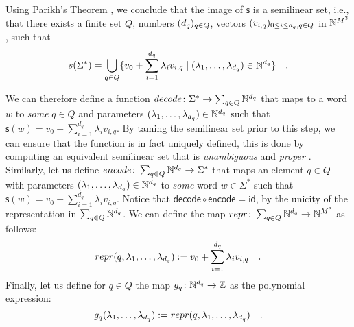 \begin{proofof}
    Using Parikh's Theorem \cite{PARI66},
    we conclude that the image of $\mathsf{s}$ is a semilinear set,
    i.e., that there exists a finite set $Q$,
    numbers $(d_q)_{q \in Q}$,
    vectors $(v_{i,q})_{0 \leq i \leq d_q, q \in Q}$ in $\mathbb{N}^{M^3}$,
    such that
    \begin{equation*}
        \mathsf{s}(\Sigma^*) =
        \bigcup_{q \in Q}
        \setof{
            v_0 + \sum_{i = 1}^{d_q} \lambda_i v_{i,q}
        }{
            (\lambda_1, \dots, \lambda_{d_q}) \in \Nat^{d_q}
        } \quad .
    \end{equation*}

    We can therefore define a function $\mathsf{decode} \colon \Sigma^* \to
    \sum_{q \in Q} \Nat^{d_q}$ that maps to a word $w$ to \emph{some} $q \in Q$
    and parameters $(\lambda_1, \dots, \lambda_{d_q}) \in \mathbb{N}^{d_q}$ such that
    $\mathsf{s}(w) = v_0 + \sum_{i = 1}^{d_q} \lambda_i v_{i,q}$. By taming the
    semilinear set prior to this step, we can ensure that the function is in
    fact uniquely defined, this is done by computing an equivalent semilinear
    set that is \emph{unambiguous} and \emph{proper} \cite{CHHA16}.
    Similarly, let us define $\mathsf{encode} \colon \sum_{q \in Q} \Nat^{d_q}
    \to \Sigma^*$ that maps an element $q \in Q$ with parameters $(\lambda_1,
    \dots, \lambda_{d_q}) \in \mathbb{N}^{d_q}$ to \emph{some} word $w \in \Sigma^*$
    such that $\mathsf{s}(w) = v_0 + \sum_{i = 1}^{d_q} \lambda_i v_{i,q}$.
    Notice that $\mathsf{decode} \circ \mathsf{encode} = \mathsf{id}$, by the
    unicity of the representation in $\sum_{q \in Q} \mathbb{N}^{d_q}$.
    We can define the map $\mathsf{repr} \colon \sum_{q \in Q} \Nat^{d_q} \to \Nat^{M^3}$
    as follows:
    \begin{equation*}
        \mathsf{repr}(q, \lambda_1, \dots, \lambda_{d_q}) \defined
        v_0 + \sum_{i = 1}^{d_q} \lambda_i v_{i,q}
        \quad .
    \end{equation*}
    Finally, let us define for $q \in Q$ the map $g_q \colon \mathbb{N}^{d_q} \to \mathbb{Z}$ as the polynomial
    expression:
    \begin{equation*}
        g_q(\lambda_1, \dots, \lambda_{d_q}) \defined \mathsf{repr}(q, \lambda_1, \dots, \lambda_{d_q}) \quad .
    \end{equation*}


\end{proofof}
